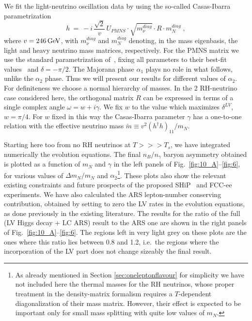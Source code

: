 \documentclass[prd,twocolumn,superscriptaddress,preprintnumbers,nofootinbib,
noshowpacs,groupedaddress]{revtex4-1} %
\begin{document}
We fit the light-neutrino oscillation data by using the so-called Casas-Ibarra parametrization~\cite{Casas:2001sr}
\begin{equation}
h \ = \ - i \, \frac{\sqrt{2}}{v} \, U_{PMNS} \cdot \sqrt{m_\nu^{diag}} \cdot R \cdot m_N^{diag} \;,
\end{equation} 
where $v = \unit[246]{GeV}$, with $m_\nu^{diag}$ and $ m_N^{diag}$ denoting, in the mass eigenbasis, the light and heavy neutrino mass matrices,  respectively.  For the PMNS matrix we use the standard parametrization of~\cite{Olive:2016xmw}, fixing all parameters to their best-fit values~\cite{Olive:2016xmw} and $\delta = -\pi/2$. The Majorana phase $\alpha_1$ plays no role in what follows, unlike the $\alpha_2$ phase. Thus we will present our results for different values of $\alpha_2$. For definiteness we choose a normal hierarchy of masses. In the 2 RH-neutrino case considered here, the orthogonal matrix $R$ can be expressed in terms of a single complex angle $\omega = w + i \gamma$. We fix $w$ to the value which maximizes $\delta^{LV}$,  $w= \pi/4$. For $w$ fixed in this way the Casas-Ibarra parameter $\gamma$ 
has a one-to-one relation with the effective neutrino mass $\widetilde m \equiv v^2 (h^\dag h)_{11}/m_N$.

Starting here too from no RH neutrinos at $T>>>T_s$,  we have integrated numerically the evolution equations.
 The final $n_B/n_\gamma$ baryon asymmetry obtained is plotted as a function of $m_N$ and $\gamma$ in the left panels of Fig.~\ref{fig:10_A}--\ref{fig:6}, for various values of $\Delta m_N/m_N$ and $\alpha_2$\footnote{As already mentioned in Section \ref{sec:oneleptonflavour} for simplicity we have not included here the thermal masses for the RH neutrinos, whose proper treatment in the density-matrix formalism requires a $T$-dependent diagonalization of their mass matrix. However, their effect is expected to be important only for small mass splitting with quite low values of $m_N$.}. These plots also show the relevant existing constraints and future prospects of the proposed SHiP~\cite{Alekhin:2015byh} and FCC-ee~\cite{Antusch:2016vyf} experiments. We have also calculated the ARS lepton-number conserving contribution, obtained by setting to zero the LV rates in the evolution equations, as done previously in the existing literature. The results for the ratio of the full (LV Higgs decay + LC ARS) result to the ARS one are shown in the right panels of Fig.~\ref{fig:10_A}--\ref{fig:6}. The regions left in very light grey on these plots are the ones where this ratio lies between 0.8 and 1.2, i.e.~the regions where the incorporation of the LV part does not change sizeably the final result. 
\end{document}
